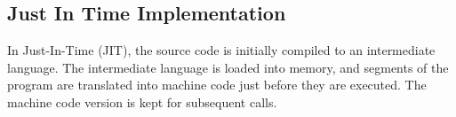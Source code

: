\subsection{Just In Time Implementation}
In Just-In-Time (JIT), the source code is initially compiled to an intermediate language. The intermediate language is loaded into memory, and segments of the program are translated into machine code just before they are executed. The machine code version is kept for subsequent calls. 